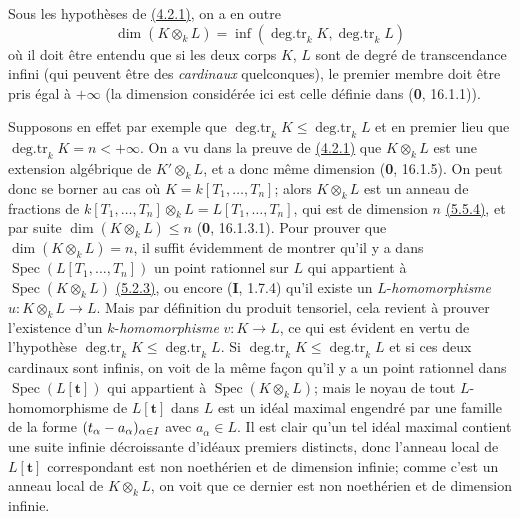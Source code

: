 \begin{remark}[4.2.1.4]
\label{IV.4.2.1.4}
Sous les hypothèses de {\hyperref[canon-index.ega4.c04.prop.4-2-1]{(4.2.1)}}, on a
en outre
\begin{equation}
 \dim(K\otimes_kL)=
 \inf(\operatorname{deg.tr}_kK,\operatorname{deg.tr}_kL)
 \label{IV.4.2.1.5}\tag{4.2.1.5}
\end{equation}
où il doit être entendu que si les deux corps $K$, $L$ sont de degré de
transcendance infini (qui peuvent être des \emph{cardinaux} quelconques), le
premier membre doit être pris égal à $+\infty$ (la dimension considérée
ici est celle définie dans (\textbf{0}, 16.1.1)).

Supposons en effet par exemple que
$\operatorname{deg.tr}_kK\leq\operatorname{deg.tr}_kL$ et en premier
lieu que $\operatorname{deg.tr}_kK=n<+\infty$. On a vu dans la preuve
de {\hyperref[canon-index.ega4.c04.prop.4-2-1]{(4.2.1)}} que $K\otimes_kL$ est une
extension algébrique de $K'\otimes_kL$, et a donc même dimension
(\textbf{0}, 16.1.5). On peut donc se borner au cas où
$K=k[T_1,\ldots,T_n]$; alors $K\otimes_kL$ est un anneau de fractions
de
$k[T_1,\ldots,T_n]\otimes_kL=L[T_1,\ldots,T_n]$,
qui est de dimension $n$ {\hyperref[canon-index.ega4.c04.cor.5-5-4]{(5.5.4)}}, et
par suite $\dim(K\otimes_kL)\leq n$ (\textbf{0}, 16.1.3.1). Pour prouver que
$\dim(K\otimes_kL)=n$, il suffit évidemment de montrer qu'il y a dans
$\operatorname{Spec}(L[T_1,\ldots,T_n])$ un point rationnel sur $L$
qui appartient à $\operatorname{Spec}(K\otimes_kL)$
{\hyperref[canon-index.ega4.c04.cor.5-2-3]{(5.2.3)}}, ou encore (\textbf{I}, 1.7.4) qu'il
existe un $L$-\emph{homomorphisme} $u:K\otimes_kL\to L$. Mais par définition
du produit tensoriel, cela revient à prouver l'existence d'un
$k$-\emph{homomorphisme} $v:K\to L$, ce qui est évident en vertu de
l'hypothèse
$\operatorname{deg.tr}_kK\leq\operatorname{deg.tr}_kL$.
Si $\operatorname{deg.tr}_kK\leq\operatorname{deg.tr}_kL$ et si ces
deux cardinaux sont infinis, on voit de la même façon qu'il y a un point
rationnel dans $\operatorname{Spec}(L[\mathbf{t}])$ qui
appartient à $\operatorname{Spec}(K\otimes_kL)$; mais le noyau de tout
$L$-homomorphisme de $L[\mathbf{t}]$ dans $L$ est un
idéal maximal engendré par une famille de la forme
$(t_\alpha- a_\alpha)_{\alpha\in I}$ avec $a_\alpha\in L$. Il est clair
qu'un tel idéal maximal contient une suite infinie décroissante
d'idéaux premiers distincts, donc l'anneau local de
$L[\mathbf{t}]$ correspondant est non noethérien et de
dimension infinie; comme c'est un anneau local de $K\otimes_kL$, on
voit que ce dernier est non noethérien et de dimension infinie.
\end{remark}

